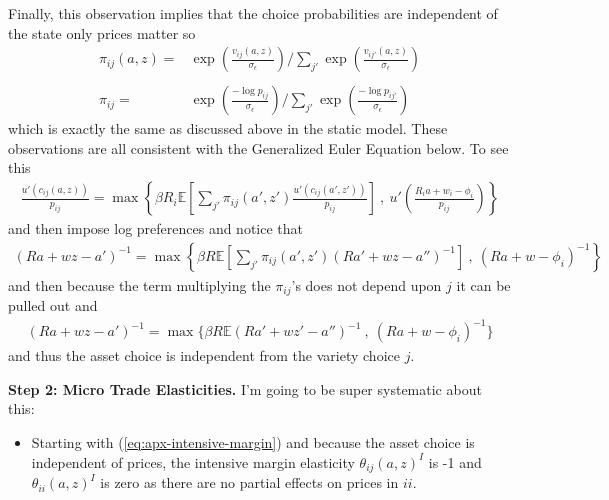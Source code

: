 \documentclass[12pt,pdftex]{article}
\begin{document}
\begin{onehalfspacing}
Finally, this observation implies that the choice probabilities are independent of the state only prices matter so
\begin{align}
\pi_{ij}(a, z) = & \exp \left( \frac{ v_{ij}(a, z) }{\sigma_{\epsilon}} \right) \Bigg / \sum_{j'} \exp \left( \frac{ v_{ij'}(a, z ) }{\sigma_{\epsilon}} \right) \\
\nonumber\\
\pi_{ij} = & \exp \left( \frac{  -\log p_{ij} }{\sigma_{\epsilon}} \right) \Bigg / \sum_{j'} \exp \left( \frac{ -\log p_{ij'} }{\sigma_{\epsilon}} \right) \label{apx-eq:shares}
\end{align}
which is exactly the same as discussed above in the static model. These observations are all consistent with the Generalized Euler Equation below. To see this
\begin{align}
\frac{u'(c_{ij}(a, z))}{p_{ij}} = \max \left\{ \beta R_{i} \mathbb{E} \left[ \sum_{j'} \pi_{ij}(a', z') \frac{u'(c_{ij}(a', z'))}{p_{ij}} \right] \ , \  u' \left( \frac{R_i a + w_i - \phi_{i}}{p_{ij}} \right) \right \}
\end{align}
and then impose log preferences and notice that
\begin{align}
(Ra + wz - a')^{-1} = \max \left\{ \beta R \mathbb{E} \left[ \sum_{j'} \pi_{ij}(a', z') (Ra' + wz - a'')^{-1} \right] \ , \   (R a + w - \phi_{i})^{-1} \right \}
\end{align}
and then because the term multiplying the $\pi_{ij}$'s does not depend upon $j$ it can be pulled out and
\begin{align}
(Ra + wz - a')^{-1} = \max \bigg \{ \beta R \mathbb{E} (Ra' + wz' - a'')^{-1}  \ , \   (R a + w - \phi_{i})^{-1}  \bigg \}
\end{align}
and thus the asset choice is independent from the variety choice $j$.

\textbf{Step 2: Micro Trade Elasticities.} I'm going to be super systematic about this:
\begin{itemize}
\item Starting with (\ref{eq:apx-intensive-margin}) and because the asset choice is independent of prices, the intensive margin elasticity $\theta_{ij}(a,z)^I$ is -1 and $\theta_{ii}(a,z)^I$ is zero as there are no partial effects on prices in $ii$.


\end{itemize}
\end{onehalfspacing}
\end{document}
